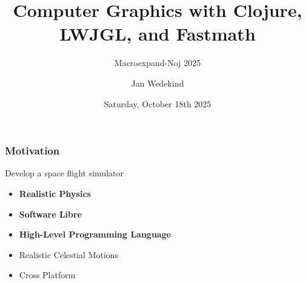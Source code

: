 \documentclass[aspectratio=169,11pt,xcolor=dvipsnames]{beamer}
\title{Computer Graphics with Clojure, LWJGL, and Fastmath}
\subtitle{Macroexpand-Noj 2025}
\author{Jan Wedekind}
\date{Saturday, October 18th 2025}
\begin{document}
\begin{frame}
  \titlepage{}
\end{frame}

\begin{frame}
  \frametitle{Motivation}
  Develop a space flight simulator
  \begin{itemize}
    \item \textbf{Realistic Physics}
    \item \textbf{Software Libre}
    \item \textbf{High-Level Programming Language}
    \item Realistic Celestial Motions
    \item Cross Platform
  \end{itemize}
\end{frame}
\end{document}
